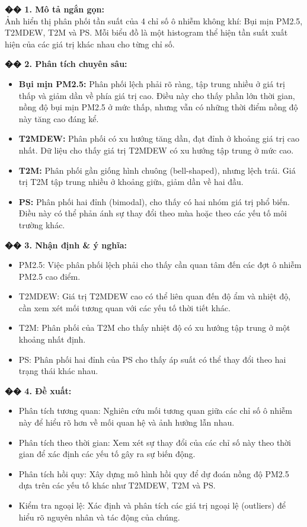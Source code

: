 \documentclass[12pt,a4paper]{article}
\begin{document}
\begin{aibox}
\textbf{�� 1. Mô tả ngắn gọn:}\\
Ảnh hiển thị phân phối tần suất của 4 chỉ số ô nhiễm không khí: Bụi mịn PM2.5, T2MDEW, T2M và PS. Mỗi biểu đồ là một histogram thể hiện tần suất xuất hiện của các giá trị khác nhau cho từng chỉ số.

\textbf{�� 2. Phân tích chuyên sâu:}
\begin{itemize}
    \item \textbf{Bụi mịn PM2.5:} Phân phối lệch phải rõ ràng, tập trung nhiều ở giá trị thấp và giảm dần về phía giá trị cao. Điều này cho thấy phần lớn thời gian, nồng độ bụi mịn PM2.5 ở mức thấp, nhưng vẫn có những thời điểm nồng độ này tăng cao đáng kể.
    \item \textbf{T2MDEW:} Phân phối có xu hướng tăng dần, đạt đỉnh ở khoảng giá trị cao nhất. Dữ liệu cho thấy giá trị T2MDEW có xu hướng tập trung ở mức cao.
    \item \textbf{T2M:} Phân phối gần giống hình chuông (bell-shaped), nhưng lệch trái. Giá trị T2M tập trung nhiều ở khoảng giữa, giảm dần về hai đầu.
    \item \textbf{PS:} Phân phối hai đỉnh (bimodal), cho thấy có hai nhóm giá trị phổ biến. Điều này có thể phản ánh sự thay đổi theo mùa hoặc theo các yếu tố môi trường khác.
\end{itemize}

\textbf{�� 3. Nhận định \& ý nghĩa:}
\begin{itemize}
    \item PM2.5: Việc phân phối lệch phải cho thấy cần quan tâm đến các đợt ô nhiễm PM2.5 cao điểm.
    \item T2MDEW: Giá trị T2MDEW cao có thể liên quan đến độ ẩm và nhiệt độ, cần xem xét mối tương quan với các yếu tố thời tiết khác.
    \item T2M: Phân phối của T2M cho thấy nhiệt độ có xu hướng tập trung ở một khoảng nhất định.
    \item PS: Phân phối hai đỉnh của PS cho thấy áp suất có thể thay đổi theo hai trạng thái khác nhau.
\end{itemize}

\textbf{�� 4. Đề xuất:}
\begin{itemize}
    \item Phân tích tương quan: Nghiên cứu mối tương quan giữa các chỉ số ô nhiễm này để hiểu rõ hơn về mối quan hệ và ảnh hưởng lẫn nhau.
    \item Phân tích theo thời gian: Xem xét sự thay đổi của các chỉ số này theo thời gian để xác định các yếu tố gây ra sự biến động.
    \item Phân tích hồi quy: Xây dựng mô hình hồi quy để dự đoán nồng độ PM2.5 dựa trên các yếu tố khác như T2MDEW, T2M và PS.
    \item Kiểm tra ngoại lệ: Xác định và phân tích các giá trị ngoại lệ (outliers) để hiểu rõ nguyên nhân và tác động của chúng.
\end{itemize}
\end{aibox}
\end{document}
